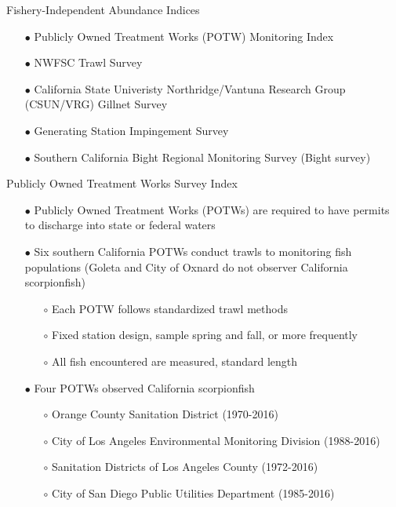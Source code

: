 \documentclass[ignorenonframetext,]{beamer}
\begin{document}
\begin{frame}{Fishery-Independent Abundance Indices}

\begin{itemize}
\item[$\bullet$] Publicly Owned Treatment Works (POTW) Monitoring Index
\item[$\bullet$] NWFSC Trawl Survey 
\item[$\bullet$] California State Univeristy Northridge/Vantuna Research Group (CSUN/VRG) Gillnet Survey
\item[$\bullet$] Generating Station Impingement Survey
\item[$\bullet$] Southern California Bight Regional Monitoring Survey (Bight survey)
\end{itemize}

\end{frame}

\begin{frame}{Publicly Owned Treatment Works Survey Index}

\begin{itemize}
\item[$\bullet$] Publicly Owned Treatment Works (POTWs) are required to have permits to discharge into state or federal waters
\item[$\bullet$] Six southern California POTWs conduct trawls to monitoring fish populations (Goleta and City of Oxnard do not observer California scorpionfish)
\begin{itemize}
\item[$\circ$] Each POTW follows standardized trawl methods
\item[$\circ$] Fixed station design, sample spring and fall, or more frequently
\item[$\circ$] All fish encountered are measured, standard length
\end{itemize}
\item[$\bullet$]  Four POTWs observed California scorpionfish
\begin{itemize}
\item[$\circ$] Orange County Sanitation District (1970-2016)
\item[$\circ$] City of Los Angeles Environmental Monitoring Division (1988-2016)
\item[$\circ$] Sanitation Districts of Los Angeles County (1972-2016)
\item[$\circ$] City of San Diego Public Utilities Department (1985-2016)
\end{itemize}
\end{itemize}

\end{frame}
\end{document}
